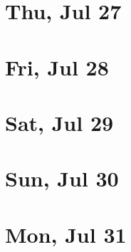 	\section{Thu, Jul 27}
		
		
	\section{Fri, Jul 28}
		
		
	\section{Sat, Jul 29}
		
		
	\section{Sun, Jul 30}
		
		
	\section{Mon, Jul 31}
		
		
